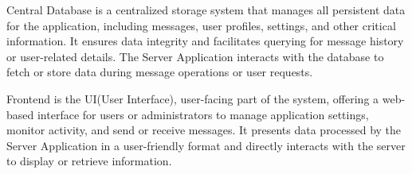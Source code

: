 Central Database is a centralized storage system that manages all persistent data for the application, including messages, user profiles, settings, and other critical information. It ensures data integrity and facilitates querying for message history or user-related details. The Server Application interacts with the database to fetch or store data during message operations or user requests.


Frontend is the UI(User Interface), user-facing part of the system, offering a web-based interface for users or administrators to manage application settings, monitor activity, and send or receive messages. It presents data processed by the Server Application in a user-friendly format and directly interacts with the server to display or retrieve information.